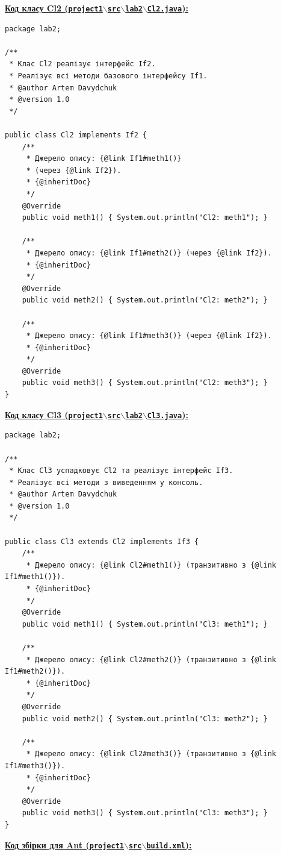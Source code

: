 \documentclass[12pt,a4paper]{article}
\begin{document}
    \textbf{\underline{Код класу Cl2 (\texttt{project1$\backslash$src$\backslash$lab2$\backslash$Cl2.java}):}}

    \begin{verbatim}
package lab2;

/**
 * Клас Cl2 реалізує інтерфейс If2.
 * Реалізує всі методи базового інтерфейсу If1.
 * @author Artem Davydchuk
 * @version 1.0
 */

public class Cl2 implements If2 {
    /**
     * Джерело опису: {@link If1#meth1()}
     * (через {@link If2}).
     * {@inheritDoc}
     */
    @Override
    public void meth1() { System.out.println("Cl2: meth1"); }

    /**
     * Джерело опису: {@link If1#meth2()} (через {@link If2}).
     * {@inheritDoc}
     */
    @Override
    public void meth2() { System.out.println("Cl2: meth2"); }

    /**
     * Джерело опису: {@link If1#meth3()} (через {@link If2}).
     * {@inheritDoc}
     */
    @Override
    public void meth3() { System.out.println("Cl2: meth3"); }
}
    \end{verbatim}

    \textbf{\underline{Код класу Cl3 (\texttt{project1$\backslash$src$\backslash$lab2$\backslash$Cl3.java}):}}

    \begin{verbatim}
package lab2;

/**
 * Клас Cl3 успадковує Cl2 та реалізує інтерфейс If3.
 * Реалізує всі методи з виведенням у консоль.
 * @author Artem Davydchuk
 * @version 1.0
 */

public class Cl3 extends Cl2 implements If3 {
    /**
     * Джерело опису: {@link Cl2#meth1()} (транзитивно з {@link If1#meth1()}).
     * {@inheritDoc}
     */
    @Override
    public void meth1() { System.out.println("Cl3: meth1"); }

    /**
     * Джерело опису: {@link Cl2#meth2()} (транзитивно з {@link If1#meth2()}).
     * {@inheritDoc}
     */
    @Override
    public void meth2() { System.out.println("Cl3: meth2"); }

    /**
     * Джерело опису: {@link Cl2#meth3()} (транзитивно з {@link If1#meth3()}).
     * {@inheritDoc}
     */
    @Override
    public void meth3() { System.out.println("Cl3: meth3"); }
}

    \end{verbatim}

    \textbf{\underline{Код збірки для Ant (\texttt{project1$\backslash$src$\backslash$build.xml}):}}
\end{document}
